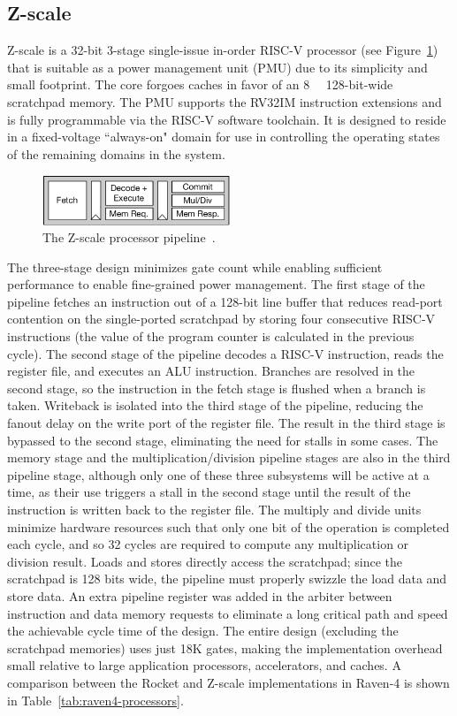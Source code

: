 \documentclass[graybox]{svmult}
\begin{document}
\subsection{Z-scale}

Z-scale is a 32-bit 3-stage single-issue in-order RISC-V processor (see Figure~\ref{fig:4-zscale}) that is suitable as a power management unit (PMU) due to its simplicity and small footprint.
The core forgoes caches in favor of an \SI{8}{\kibi\byte} 128-bit-wide scratchpad memory.
The PMU supports the RV32IM instruction extensions and is fully programmable via the RISC-V software toolchain.
It is designed to reside in a fixed-voltage ``always-on" domain for use in controlling the operating states of the remaining domains in the system.

\begin{figure}
  \centering
  \includegraphics[width=0.5\textwidth]{4-zscale}
  \caption{The Z-scale processor pipeline~\cite{Keller2017}.}
  \label{fig:4-zscale}
\end{figure}

The three-stage design minimizes gate count while enabling sufficient performance to enable fine-grained power management.
The first stage of the pipeline fetches an instruction out of a 128-bit line buffer that reduces read-port contention on the single-ported scratchpad by storing four consecutive RISC-V instructions (the value of the program counter is calculated in the previous cycle).
The second stage of the pipeline decodes a RISC-V instruction, reads the register file, and executes an ALU instruction.
Branches are resolved in the second stage, so the instruction in the fetch stage is flushed when a branch is taken.
Writeback is isolated into the third stage of the pipeline, reducing the fanout delay on the write port of the register file.
The result in the third stage is bypassed to the second stage, eliminating the need for stalls in some cases.
The memory stage and the multiplication/division pipeline stages are also in the third pipeline stage, although only one of these three subsystems will be active at a time, as their use triggers a stall in the second stage until the result of the instruction is written back to the register file.
The multiply and divide units minimize hardware resources such that only one bit of the operation is completed each cycle, and so 32 cycles are required to compute any multiplication or division result.
Loads and stores directly access the scratchpad; since the scratchpad is 128 bits wide, the pipeline must properly swizzle the load data and store data.
An extra pipeline register was added in the arbiter between instruction and data memory requests to eliminate a long critical path and speed the achievable cycle time of the design.
The entire design (excluding the scratchpad memories) uses just 18K gates, making the implementation overhead small relative to large application processors, accelerators, and caches.
A comparison between the Rocket and Z-scale implementations in Raven-4 is shown in Table~\ref{tab:raven4-processors}.
\end{document}
